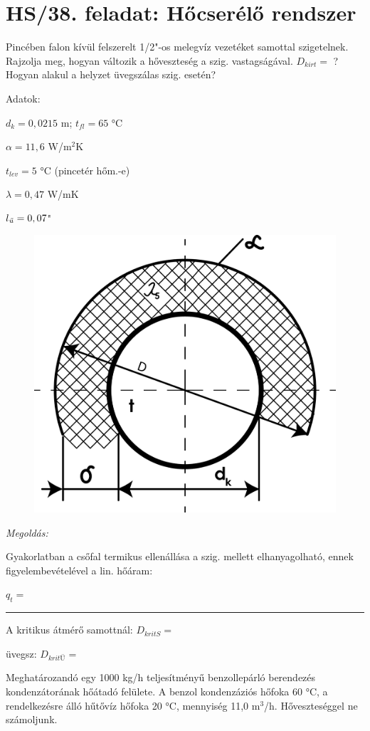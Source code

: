
\section*{HS/38. feladat: Hőcserélő rendszer}
Pincében falon kívül felszerelt 1/2"-os melegvíz vezetéket samottal szigetelnek. Rajzolja meg, hogyan változik a hőveszteség a szig. vastagságával. $D_{kirt}=$ ?Hogyan alakul a helyzet üvegszálas szig. esetén?

\vspace{5mm}
\noindent
Adatok: 
 
$d_k=0,0215$ m; $t_{fl}=65$ °C

$\alpha=11,6$ W/m$^2$K

$t_{lev}=5$ °C (pincetér hőm.-e)

$\lambda=0,47$ W/mK

$l_\textmd{\textit{ü}}=0,07$"
\begin{figure}[H]
	\begin{center}
		\includegraphics[width=0.5\linewidth]{u9awby123/fig01.png}
	\end{center}
\end{figure}


\vspace{5mm}
\noindent
\textit{Megoldás:}

Gyakorlatban a csőfal termikus ellenállása a szig. mellett elhanyagolható, ennek figyelembevételével a lin. hőáram:

\vspace{5mm}
$q_t=$ \rule{2cm}{0.4pt}

\vspace{5mm}
A kritikus átmérő samottnál: $D_{kritS}=$

üvegsz: $D_{kritÜ}=$

\vspace{5mm}
Meghatározandó egy 1000 kg/h teljesítményű benzollepárló berendezés kondenzátorának hőátadó felülete. A benzol kondenzáziós hőfoka 60 °C, a rendelkezésre álló hűtővíz hőfoka 20 °C, mennyiség 11,0 m$^3$/h. Hőveszteséggel ne számoljunk.

